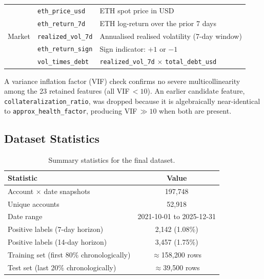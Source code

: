 \documentclass[12pt,a4paper]{article}
\begin{document}
\begin{table}[htbp]
\begin{tabularx}{\textwidth}{llX}
\midrule
\multirow{5}{*}{Market}
  & \texttt{eth\_price\_usd}        & ETH spot price in USD \\
  & \texttt{eth\_return\_7d}        & ETH log-return over the prior 7 days \\
  & \texttt{realized\_vol\_7d}      & Annualised realised volatility (7-day window) \\
  & \texttt{eth\_return\_sign}      & Sign indicator: $+1$ or $-1$ \\
  & \texttt{vol\_times\_debt}       & \texttt{realized\_vol\_7d} $\times$ \texttt{total\_debt\_usd} \\
\bottomrule
\end{tabularx}
\end{table}

A variance inflation factor (VIF) check confirms no severe multicollinearity
among the 23 retained features (all VIF\,$<10$).  An earlier candidate
feature, \texttt{collateralization\_ratio}, was dropped because it is
algebraically near-identical to \texttt{approx\_health\_factor}, producing
VIF\,$\gg 10$ when both are present.

\subsection{Dataset Statistics}

\begin{table}[htbp]
\centering
\caption{Summary statistics for the final dataset.}
\label{tab:stats}
\renewcommand{\arraystretch}{1.2}
\begin{tabular}{lc}
\toprule
\textbf{Statistic} & \textbf{Value} \\
\midrule
Account $\times$ date snapshots            & 197{,}748 \\
Unique accounts                            & 52{,}918 \\
Date range                                 & 2021-10-01 to 2025-12-31 \\
Positive labels (7-day horizon)            & 2{,}142 (1.08\%) \\
Positive labels (14-day horizon)           & 3{,}457 (1.75\%) \\
Training set (first 80\% chronologically)  & $\approx$158{,}200 rows \\
Test set (last 20\% chronologically)       & $\approx$39{,}500 rows \\
\bottomrule
\end{tabular}
\end{table}
\end{document}
